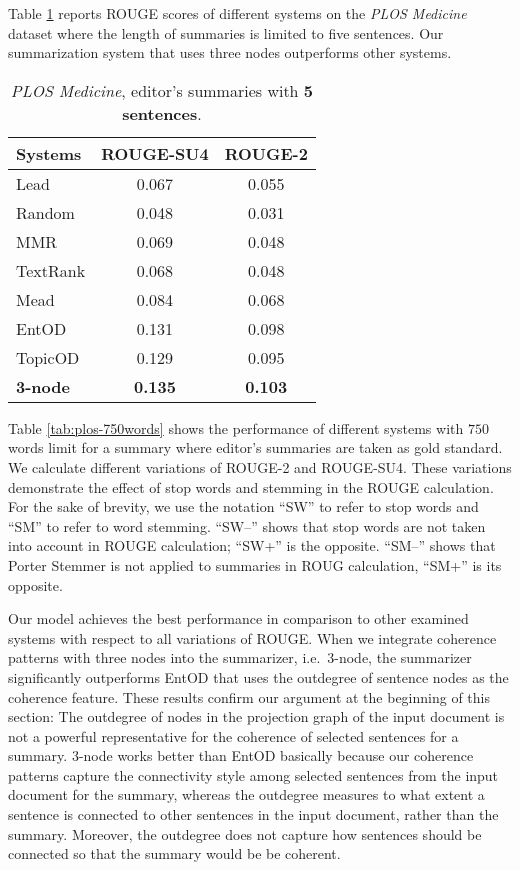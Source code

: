 Table \ref{table:plos_5len_editor} reports ROUGE scores of different systems on the \emph{PLOS Medicine} dataset where the length of summaries is limited to five sentences. 
Our summarization system that uses three nodes outperforms other systems.  


\begin{table}[!ht]
	\begin{center}
		\begin{tabular}{lcc}
		\toprule
		\textbf{Systems} 			& \textbf{ROUGE-SU4} &\textbf{ROUGE-2}\\
		\midrule
		Lead 				& 0.067 	& 0.055  \\
		Random 				& 0.048  	& 0.031  \\
		MMR 				& 0.069 	& 0.048  \\
		TextRank 			& 0.068  	& 0.048  \\
		Mead 				& 0.084 	& 0.068  \\
		EntOD 				& 0.131		& 0.098  \\
		TopicOD				& 0.129 	& 0.095  \\
		\textbf{3-node} 				& \textbf{0.135} & \textbf{0.103} \\
		\bottomrule
		\end{tabular}
	\end{center}
	\caption{\emph{PLOS Medicine}, editor's summaries with \textbf{5 sentences}.}
	\label{table:plos_5len_editor}
\end{table}

Table \ref{tab:plos-750words} shows the performance of different systems with $750$ words limit for a summary where editor's summaries are taken as gold standard. 
We calculate different variations of ROUGE-2 and ROUGE-SU4. 
These variations demonstrate the effect of stop words and stemming in the ROUGE calculation.
For the sake of brevity, we use the notation ``SW'' to refer to stop words and ``SM'' to refer to word stemming.  
``SW--'' shows that stop words are not taken into account in ROUGE calculation; ``SW+'' is the opposite. 
``SM--'' shows that Porter Stemmer is not applied to summaries in ROUG calculation, ``SM+'' is its opposite. 
 
Our model achieves the best performance in comparison to other examined systems with respect to all variations of ROUGE. 
When we integrate coherence patterns with three nodes into the summarizer, i.e.\ 3-node, the summarizer significantly outperforms EntOD that uses the outdegree of sentence nodes as the coherence feature. 
These results confirm our argument at the beginning of this section: The outdegree of nodes in the projection graph of the input document is not a powerful representative for the coherence of selected sentences for a summary. 
3-node works better than EntOD basically because our coherence patterns capture the connectivity style among selected sentences from the input document for the summary, whereas
the outdegree measures to what extent a sentence is connected to other sentences in the input document, rather than the summary. 
Moreover, the outdegree does not capture how sentences should be connected so that the summary would be be coherent. 

